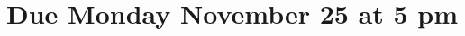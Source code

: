 \documentclass[11pt,fleqn]{article}
\begin{document}
\maketitle
\section*{Due Monday November 25 at 5 pm}










\end{document}
